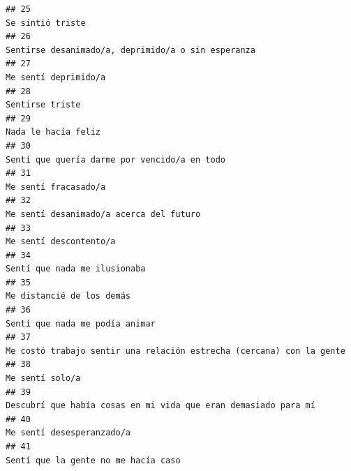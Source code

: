 \documentclass[
]{article}
\begin{document}
\begin{verbatim}
## 25                                                                                                                                          Se sintió triste
## 26                                                                                                        Sentirse desanimado/a, deprimido/a o sin esperanza
## 27                                                                                                                                      Me sentí deprimido/a
## 28                                                                                                                                           Sentirse triste
## 29                                                                                                                                       Nada le hacía feliz
## 30                                                                                                              Sentí que quería darme por vencido/a en todo
## 31                                                                                                                                      Me sentí fracasado/a
## 32                                                                                                                   Me sentí desanimado/a acerca del futuro
## 33                                                                                                                                    Me sentí descontento/a
## 34                                                                                                                              Sentí que nada me ilusionaba
## 35                                                                                                                                 Me distancié de los demás
## 36                                                                                                                            Sentí que nada me podía animar
## 37                                                                                      Me costó trabajo sentir una relación estrecha (cercana) con la gente
## 38                                                                                                                                           Me sentí solo/a
## 39                                                                                            Descubrí que había cosas en mi vida que eran demasiado para mí
## 40                                                                                                                                 Me sentí desesperanzado/a
## 41                                                                                                                       Sentí que la gente no me hacía caso

\end{verbatim}
\end{document}
